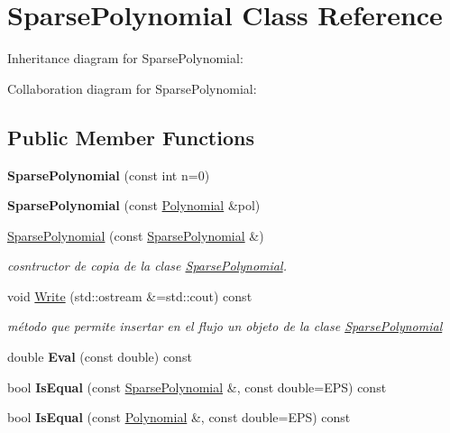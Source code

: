 \hypertarget{classSparsePolynomial}{}\section{Sparse\+Polynomial Class Reference}
\label{classSparsePolynomial}


Inheritance diagram for Sparse\+Polynomial\+:


Collaboration diagram for Sparse\+Polynomial\+:
\subsection*{Public Member Functions}
\begin{DoxyCompactItemize}
\item 
\mbox{\label{classSparsePolynomial_a4bbfebbaed6e1c29bb464fef51231bb6}} 
{\bfseries Sparse\+Polynomial} (const int n=0)
\item 
\mbox{\label{classSparsePolynomial_aa01722a13d2bc654c20974ed3cd0d980}} 
{\bfseries Sparse\+Polynomial} (const \hyperlink{classPolynomial}{Polynomial} \&pol)
\item 
\hyperlink{classSparsePolynomial_a609fb9d718a02bcce423c08c1941a247}{Sparse\+Polynomial} (const \hyperlink{classSparsePolynomial}{Sparse\+Polynomial} \&)
\begin{DoxyCompactList}\small\item\em cosntructor de copia de la clase \hyperlink{classSparsePolynomial}{Sparse\+Polynomial}. \end{DoxyCompactList}\item 
\mbox{\label{classSparsePolynomial_a82f2e04ad25a2bf0f5042dde758c9203}} 
void \hyperlink{classSparsePolynomial_a82f2e04ad25a2bf0f5042dde758c9203}{Write} (std\+::ostream \&=std\+::cout) const
\begin{DoxyCompactList}\small\item\em método que permite insertar en el flujo un objeto de la clase \hyperlink{classSparsePolynomial}{Sparse\+Polynomial} \end{DoxyCompactList}\item 
\mbox{\label{classSparsePolynomial_a25ce53adc8f18fd7284a2868118ac8d8}} 
double {\bfseries Eval} (const double) const
\item 
\mbox{\label{classSparsePolynomial_a7160160798f19b1414b2dc1e1da47e88}} 
bool {\bfseries Is\+Equal} (const \hyperlink{classSparsePolynomial}{Sparse\+Polynomial} \&, const double=E\+PS) const
\item 
\mbox{\label{classSparsePolynomial_a547a43013bc1d4e15fbd2acb9002123e}} 
bool {\bfseries Is\+Equal} (const \hyperlink{classPolynomial}{Polynomial} \&, const double=E\+PS) const
\end{DoxyCompactItemize}



